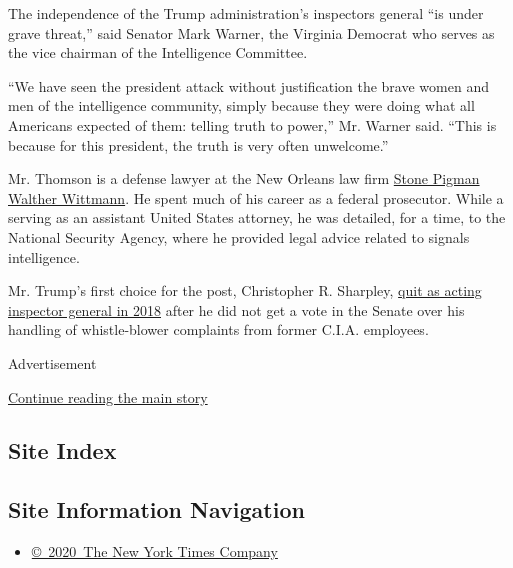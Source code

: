 The independence of the Trump administration's inspectors general ``is
under grave threat,'' said Senator Mark Warner, the Virginia Democrat
who serves as the vice chairman of the Intelligence Committee.

``We have seen the president attack without justification the brave
women and men of the intelligence community, simply because they were
doing what all Americans expected of them: telling truth to power,'' Mr.
Warner said. ``This is because for this president, the truth is very
often unwelcome.''

Mr. Thomson is a defense lawyer at the New Orleans law firm
\href{https://www.stonepigman.com/attorneys-Peter-Thomson.html}{Stone
Pigman Walther Wittmann}. He spent much of his career as a federal
prosecutor. While a serving as an assistant United States attorney, he
was detailed, for a time, to the National Security Agency, where he
provided legal advice related to signals intelligence.

Mr. Trump's first choice for the post, Christopher R. Sharpley,
\href{https://www.politico.com/story/2018/07/20/christopher-sharpley-cia-resigns-734956}{quit
as acting inspector general in 2018} after he did not get a vote in the
Senate over his handling of whistle-blower complaints from former C.I.A.
employees.

Advertisement

\protect\hyperlink{after-bottom}{Continue reading the main story}

\hypertarget{site-index}{%
\subsection{Site Index}\label{site-index}}

\hypertarget{site-information-navigation}{%
\subsection{Site Information
Navigation}\label{site-information-navigation}}

\begin{itemize}
\tightlist
\item
  \href{https://help.nytimes.com/hc/en-us/articles/115014792127-Copyright-notice}{©~2020~The
  New York Times Company}
\end{itemize}

